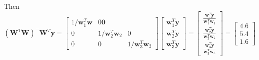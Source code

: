 \documentclass{article}
\begin{document}
\begin{enumerate}[leftmargin = 0 em, label = \arabic*., font = \bfseries]
\begin{enumerate}
 	Then
 	\[(\bm W^T \bm W)^- \bm W^T \bm y = \begin{bmatrix}
 		1/\bm w_1^T \bm w & 0 \bm 0\\
 		0 & 1/ \bm w_{2}^T \bm w_2 & 0 \\
 		0 & 0 & 1 / \bm w_3^T \bm w_3
 	\end{bmatrix} \begin{bmatrix}
 		\bm w_1^T \bm y\\
 		\bm w_2^T \bm y\\
 		\bm w_3^T \bm y
 	\end{bmatrix} = \begin{bmatrix}
 		\frac{\bm w_1^T \bm y}{\bm w_1^T \bm w_1}\\
 		\frac{\bm w_2^T \bm y}{\bm w_2^T \bm w_2}\\
 		\frac{\bm w_3^T \bm y}{\bm w_3^T \bm w_3}
 	\end{bmatrix} = \begin{bmatrix}
 		4.6 \\ 5.4 \\ 1.6
 	\end{bmatrix}\]


\end{enumerate}
\end{enumerate}
\end{document}
